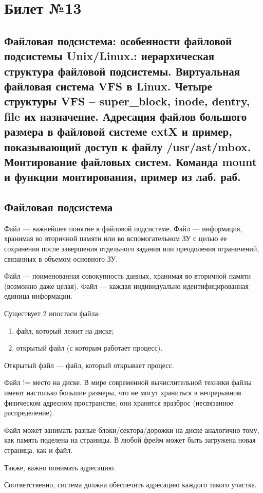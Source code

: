 \chapter{Билет №13}

\section*{Файловая подсистема: особенности файловой подсистемы Unix/Linux.: иерархическая структура файловой подсистемы. Виртуальная файловая система VFS в Linux. Четыре структуры VFS – super\_block, inode, dentry, file их назначение. Адресация файлов большого размера в файловой системе extX и пример, показывающий доступ к файлу /usr/ast/mbox. Монтирование файловых систем. Команда mount и функции монтирования, пример из лаб. раб.}

\section{Файловая подсистема}
Файл --- важнейшее понятие в файловой подсистеме. Файл --- информация, хранимая во вторичной памяти или во вспомогательном ЗУ с целью ее сохранения после завершения отдельного задания или преодоления ограничений, связанных в объемом основного ЗУ.

Файл --- поименованная совокупность данных, хранимая во вторичной памяти (возможно даже целая). Файл --- каждая индивидуально идентифицированная единица информации.

Существует 2 ипостаси файла:
\begin{enumerate}
	\item файл, который лежит на диске;
	\item открытый файл (с которым работает процесс).
\end{enumerate}

Открытый файл --- файл, который открывает процесс.

Файл != место на диске. В мире современной вычислительной техники файлы имеют настолько большие размеры, что не могут храниться в непрерывном физическом адресном пространстве, они хранятся вразброс (несвязанное распределение).

Файл может занимать разные блоки/сектора/дорожки на диске аналогично тому, как память поделена на страницы. В любой фрейм может быть загружена новая страница, как и файл. 

Также, важно понимать адресацию. 

Соответственно, система должна обеспечить адресацию каждого такого участка.

